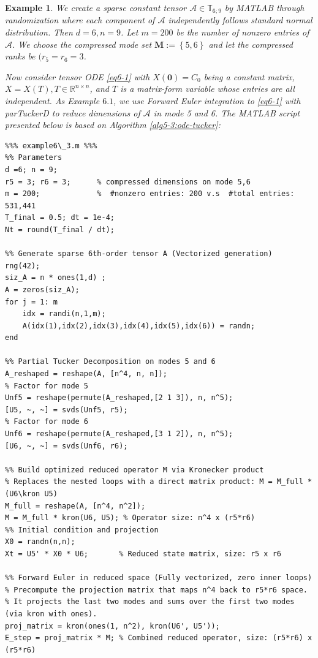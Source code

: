 \documentclass[11pt, oneside]{article}  %
\newtheorem{exm}[thm]{Example}
\newcommand{\set}[1]{\left\{#1\right\}}
\newcommand{\RR}{\mathbb{R}}
\newcommand{\TT}{\mathbb{T}}
\newcommand{\A}{\mathcal{A}}
\newcommand{\caM}{\mathbf{M}}
\begin{document}
\begin{exm}\label{exm6-3}
We create a sparse constant tensor $\A\in\TT_{6;9}$ by MATLAB through randomization where each component of $\A$ independently follows 
standard normal distribution. Then $d = 6, n = 9$. Let $m = 200$ be the number of nonzero entries of  $\A$.  We choose the compressed mode set 
$\caM:=\set{5,6}$ and let the compressed ranks be $(r_{5} = r_{6} =3$. 
 
Now consider tensor ODE \eqref{eq6-1} with $X(\mathbf{0}) = C_{0}$ being a constant matrix, $X= X(T), T\in\RR^{n\times n}$, and $T$ is a 
matrix-form variable whose entries are all independent.  As Example $6.1$, we use Forward Euler integration to \eqref{eq6-1} with parTuckerD to 
reduce dimensions of $\A$ in mode 5 and 6.  The MATLAB script presented below is based on Algorithm \ref{alg5-3:ode-tucker}: 

\begin{verbatim}
%%% example6\_3.m %%%
%% Parameters
d =6; n = 9; 
r5 = 3; r6 = 3;      % compressed dimensions on mode 5,6 
m = 200;             %  #nonzero entries: 200 v.s  #total entries: 531,441   
T_final = 0.5; dt = 1e-4;  
Nt = round(T_final / dt);

%% Generate sparse 6th-order tensor A (Vectorized generation)
rng(42);
siz_A = n * ones(1,d) ;  
A = zeros(siz_A); 
for j = 1: m
    idx = randi(n,1,m);
    A(idx(1),idx(2),idx(3),idx(4),idx(5),idx(6)) = randn;
end

%% Partial Tucker Decomposition on modes 5 and 6
A_reshaped = reshape(A, [n^4, n, n]);
% Factor for mode 5
Unf5 = reshape(permute(A_reshaped,[2 1 3]), n, n^5);
[U5, ~, ~] = svds(Unf5, r5);
% Factor for mode 6
Unf6 = reshape(permute(A_reshaped,[3 1 2]), n, n^5);
[U6, ~, ~] = svds(Unf6, r6);

%% Build optimized reduced operator M via Kronecker product
% Replaces the nested loops with a direct matrix product: M = M_full * (U6\kron U5)
M_full = reshape(A, [n^4, n^2]);
M = M_full * kron(U6, U5); % Operator size: n^4 x (r5*r6)
%% Initial condition and projection
X0 = randn(n,n);
Xt = U5' * X0 * U6;       % Reduced state matrix, size: r5 x r6

%% Forward Euler in reduced space (Fully vectorized, zero inner loops)
% Precompute the projection matrix that maps n^4 back to r5*r6 space.
% It projects the last two modes and sums over the first two modes (via kron with ones).
proj_matrix = kron(ones(1, n^2), kron(U6', U5')); 
E_step = proj_matrix * M; % Combined reduced operator, size: (r5*r6) x (r5*r6)


\end{verbatim}
\end{exm}
\end{document}
